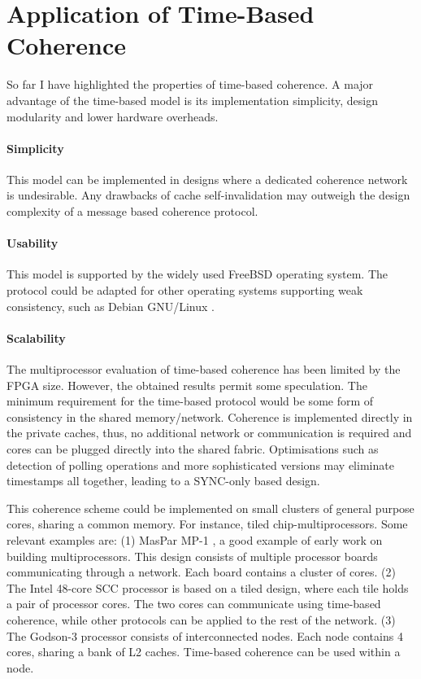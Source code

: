 \clearpage
\section{Application of Time-Based Coherence }
	\label{section_application_timebased}
	So far I have highlighted the properties of time-based coherence. A major advantage of the time-based model is its implementation simplicity, design modularity and lower hardware overheads.
	
	\paragraph{Simplicity}
		This model can be implemented in designs where a dedicated coherence network is undesirable. Any drawbacks of cache self-invalidation may outweigh the design complexity of a message based coherence protocol. 
			
	\paragraph{Usability}
		This model is supported by the widely used FreeBSD operating system. The protocol could be adapted for other operating systems supporting weak consistency, such as Debian GNU/Linux \cite{Merrill03}.
	
	\paragraph{Scalability}
		The multiprocessor evaluation of time-based coherence has been limited by the FPGA size. However, the obtained results permit some speculation. The minimum requirement for the time-based protocol would be some form of consistency in the shared memory/network. Coherence is implemented directly in the private caches, thus, no additional network or communication is required and cores can be plugged directly into the shared fabric. 
		Optimisations such as detection of polling operations and more sophisticated versions may eliminate timestamps all together, leading to a SYNC-only based design.
		
		This coherence scheme could be implemented on small clusters of general purpose cores, sharing a common memory. For instance, tiled chip-multiprocessors.
		Some relevant examples are: (1) MasPar MP-1 \cite{maspar90}, a good example of early work on building multiprocessors. This design consists of multiple processor boards communicating through a network. Each board contains a cluster of cores. (2) The Intel 48-core SCC \cite{Mattson10} processor is based on a tiled design, where each tile holds a pair of processor cores. The two cores can communicate using time-based coherence, while other protocols can be applied to the rest of the network. (3) The Godson-3 processor \cite{godson3} consists of interconnected nodes. Each node contains 4 cores, sharing a bank of L2 caches. Time-based coherence can be used within a node.


